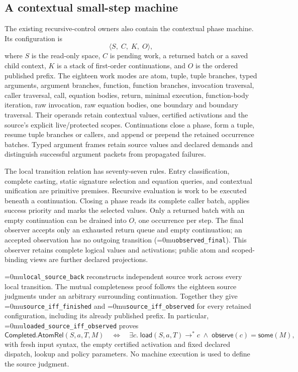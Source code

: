 \documentclass[11pt,a4paper]{article}
\newcommand{\name}[1]{\textup{\Urlmuskip=0mu\relax\nolinkurl{#1}}}
\begin{document}
\subsection*{A contextual small-step machine}

The existing recursive-control owners also contain the contextual phase
machine. Its configuration is
\[
  \langle S,\;C,\;K,\;O\rangle,
\]
where $S$ is the read-only space, $C$ is pending work, a returned batch or a
saved child context,
$K$ is a stack of first-order continuations, and $O$ is the ordered published
prefix. The eighteen work modes are atom, tuple, tuple branches, typed arguments,
argument branches, function, function branches, invocation traversal, caller
traversal, call, equation bodies, return, minimal execution, function-body
iteration, raw invocation, raw equation bodies, one boundary and boundary
traversal. Their operands retain contextual values,
certified activations and the source's explicit live/protected scopes.
Continuations close a phase, form a tuple, resume tuple branches or callers,
and append or prepend the retained occurrence batches. Typed argument frames
retain source values and declared demands and distinguish successful argument
packets from propagated failures.

The local transition relation has seventy-seven rules. Entry classification,
complete casting, static signature selection and equation queries, and contextual unification are primitive
premises. Recursive evaluation is work to be executed beneath a continuation.
Closing a phase reads its complete caller batch, applies success priority and
marks the selected values. Only a returned batch with an empty continuation
can be drained into $O$, one occurrence per step. The final observer accepts
only an exhausted return queue and empty continuation; an accepted observation
has no outgoing transition (\name{observed_final}).
This observer retains complete logical values and activations; public atom
and scoped-binding views are further declared projections.

\name{local_source_back} reconstructs independent source work across every
local transition. The mutual completeness proof follows the eighteen source
judgments under an arbitrary surrounding continuation. Together they give
\name{source_iff_finished} and \name{source_iff_observed} for every retained
configuration, including its already published prefix. In particular,
\name{loaded_source_iff_observed} proves
\[
 \mathsf{Completed.AtomRel}(S,a,T,M)
 \quad\Longleftrightarrow\quad
 \exists c.\;\mathsf{load}(S,a,T)\longrightarrow^{*}c
              \;\land\;\mathsf{observe}(c)=\mathsf{some}(M),
\]
with fresh input syntax, the empty certified activation and fixed declared
dispatch, lookup and policy parameters. No machine execution is used to
define the source judgment.
\end{document}
